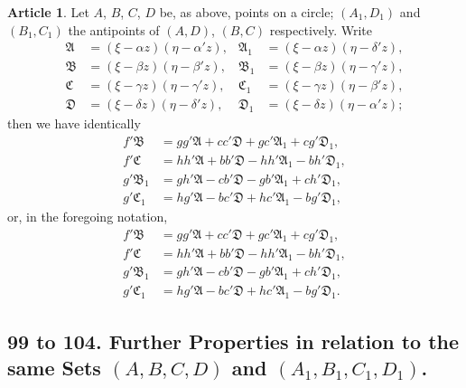 \documentclass[11pt,a4paper]{article}
\theoremstyle{definition}
\newtheorem{art}{Article}
\begin{document}
\begin{art}
Let $A$, $B$, $C$, $D$ be, as above, points on a circle; $(A_{1}, D_{1})$ and $(B_{1}, C_{1})$ the antipoints of $(A, D)$, $(B, C)$ respectively. Write
\begin{align*}
\mathfrak{A} &= (\xi - \alpha z)(\eta - \alpha' z), & \mathfrak{A}_{1} &= (\xi - \alpha z)(\eta - \delta' z), \\
\mathfrak{B} &= (\xi - \beta z)(\eta - \beta' z), & \mathfrak{B}_{1} &= (\xi - \beta z)(\eta - \gamma' z), \\
\mathfrak{C} &= (\xi - \gamma z)(\eta - \gamma' z), & \mathfrak{C}_{1} &= (\xi - \gamma z)(\eta - \beta' z), \\
\mathfrak{D} &= (\xi - \delta z)(\eta - \delta' z), & \mathfrak{D}_{1} &= (\xi - \delta z)(\eta - \alpha' z);
\end{align*}
then we have identically
\begin{align*}
f'\mathfrak{B} &= gg'\mathfrak{A} + cc'\mathfrak{D} + gc'\mathfrak{A}_{1} + cg'\mathfrak{D}_{1}, \\
f'\mathfrak{C} &= hh'\mathfrak{A} + bb'\mathfrak{D} - hh'\mathfrak{A}_{1} - bh'\mathfrak{D}_{1}, \\
g'\mathfrak{B}_{1} &= gh'\mathfrak{A} - cb'\mathfrak{D} - gb'\mathfrak{A}_{1} + ch'\mathfrak{D}_{1}, \\
g'\mathfrak{C}_{1} &= hg'\mathfrak{A} - bc'\mathfrak{D} + hc'\mathfrak{A}_{1} - bg'\mathfrak{D}_{1},
\end{align*}
or, in the foregoing notation,
\begin{align*}
f'\mathfrak{B} &= gg'\mathfrak{A} + cc'\mathfrak{D} + gc'\mathfrak{A}_{1} + cg'\mathfrak{D}_{1}, \\
f'\mathfrak{C} &= hh'\mathfrak{A} + bb'\mathfrak{D} - hh'\mathfrak{A}_{1} - bh'\mathfrak{D}_{1}, \\
g'\mathfrak{B}_{1} &= gh'\mathfrak{A} - cb'\mathfrak{D} - gb'\mathfrak{A}_{1} + ch'\mathfrak{D}_{1}, \\
g'\mathfrak{C}_{1} &= hg'\mathfrak{A} - bc'\mathfrak{D} + hc'\mathfrak{A}_{1} - bg'\mathfrak{D}_{1}.
\end{align*}
\end{art}

\subsection*{99 to 104. Further Properties in relation to the same Sets $(A, B, C, D)$ and $(A_{1}, B_{1}, C_{1}, D_{1})$.}
\end{document}
